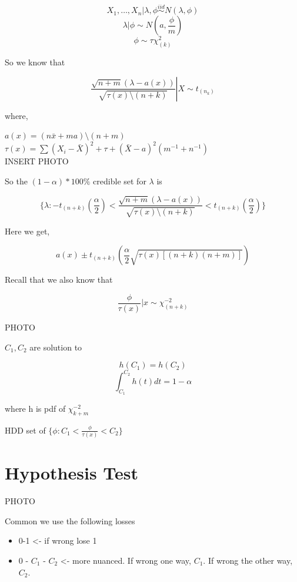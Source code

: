 \documentclass[11pt,fleqn]{book} %
\begin{document}
\begin{example}
	$$X_1, \dots, X_n |\lambda, \phi \stackrel{iid}{\sim} N(\lambda, \phi)$$
	$$\lambda | \phi \sim N(a, \frac{\phi}{m}) $$
	$$\phi \sim \tau \chi^2_{(k)} $$

	So we know that 

			$$\frac{\sqrt{n +  m} (\lambda - a(x))}{\sqrt{\tau(x) \setminus (n + k)}} \left| \right. X \sim t_{(n_k)}$$

	where, 

	$a(x) = (n \bar{x} + ma) \setminus (n + m)$\\
	$\tau(x) = \sum(X_i - \bar{X})^2 + \tau + (\bar{X} - a)^2(m^{-1} + n^{-1})$\\

	INSERT PHOTO

	So the $(1 - \alpha)*100\%$ credible set for $\lambda$ is

			$$\{\lambda: -t_{(n+k)}(\frac{\alpha}{2}) < \frac{\sqrt{n +  m} (\lambda - a(x))}{\sqrt{\tau(x) \setminus (n + k)}} < t_{(n+k)} (\frac{\alpha}{2})\} $$

	Here we get, 

			$$a(x) \pm t_{(n+k)}(\frac{\alpha}{2} \sqrt{\tau(x) [(n+k)(n+m)]}) $$


	Recall that we also know that

			$$\frac{\phi}{\tau(x)}|x \sim \chi^{-2}_{(n+k)} $$

	PHOTO

	$C_1, C_2$ are solution to 

			$$h(C_1) = h(C_2)$$
			$$\int^{C_2}_{C_1} h(t) d t = 1 - \alpha $$

	where h is pdf of $\chi^{-2}_{k+m}$

	HDD set of $\{\phi: C_1 < \frac{\phi}{\tau(x)} < C_2 \}$

\end{example}



\section{Hypothesis Test}

PHOTO 

Common we use the following losses\\

	\begin{itemize}
		\item 0-1 <- if wrong lose 1
		\item 0 - $C_1$ - $C_2$ <- more nuanced. If wrong one way, $C_1$. If wrong the other way, $C_2$. 
	\end{itemize}
\end{document}
